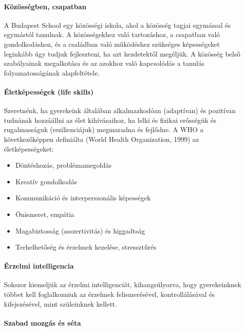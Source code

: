\paragraph{Közösségben,
      csapatban}

A Budapest School egy közösségi iskola, ahol a közösség tagjai egymással
és egymástól tanulnak. A közösségekhez való tartozáshoz, a csapatban
való gondolkodáshoz, és a családban való működéshez szükséges
képességeket leginkább úgy tudjuk fejleszteni, ha azt kezdetektől
megéljük. A közösség belső szabályainak megalkotása és az azokhoz való
kapcsolódás a tanulás folyamatosságának alapfeltétele.

\paragraph{Életképességek (life
      skills)}

Szeretnénk, ha gyerekeink általában alkalmazkodóan (adaptívan) és
pozitívan tudnának hozzáállni az élet kihívásaihoz, ha lelki és fizikai
erősségük és rugalmasságuk (rezilienciájuk) megmaradna és fejlődne. A
WHO a következőképpen definiálta (World Health Organization, 1999) az
életképességeket:

\begin{itemize}

      \item
            Döntéshozás, problémamegoldás
      \item
            Kreatív gondolkodás
      \item
            Kommunikáció és interperszonális képességek
      \item
            Önismeret, empátia
      \item
            Magabiztosság (asszertivitás) és higgadtság
      \item
            Terhelhetőség és érzelmek kezelése, stressztűrés
\end{itemize}

\paragraph{Érzelmi intelligencia}\label{uxe9rzelmi-intelligencia}

Sokszor kiemeljük az érzelmi intelligenciát, kihangsúlyozva, hogy
gyerekeinknek többet kell foglalkozniuk az érzelmek felismerésével,
kontrollálásával és kifejezésével, mint szüleinknek kellett.

\paragraph{Szabad mozgás és séta}\label{szabad-mozguxe1s-uxe9s-suxe9ta}

